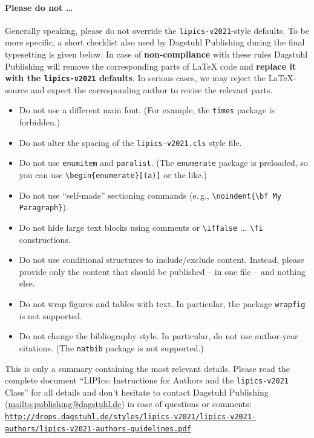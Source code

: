 \documentclass[a4paper,UKenglish,cleveref, autoref, thm-restate]{lipics-v2021}
\begin{document}
\paragraph*{Please do not \ldots} %
Generally speaking, please do not override the \texttt{lipics-v2021}-style defaults. To be more specific, a short checklist also used by Dagstuhl Publishing during the final typesetting is given below.
In case of \textbf{non-compliance} with these rules Dagstuhl Publishing will remove the corresponding parts of \LaTeX{} code and \textbf{replace it with the \texttt{lipics-v2021} defaults}. In serious cases, we may reject the LaTeX-source and expect the corresponding author to revise the relevant parts.
\begin{itemize}
\item Do not use a different main font. (For example, the \texttt{times} package is forbidden.)
\item Do not alter the spacing of the \texttt{lipics-v2021.cls} style file.
\item Do not use \verb+enumitem+ and \verb+paralist+. (The \texttt{enumerate} package is preloaded, so you can use
 \verb+\begin{enumerate}[(a)]+ or the like.)
\item Do not use ``self-made'' sectioning commands (e.\,g., \verb+\noindent{\bf My+ \verb+Paragraph}+).
\item Do not hide large text blocks using comments or \verb+\iffalse+ $\ldots$ \verb+\fi+ constructions.
\item Do not use conditional structures to include/exclude content. Instead, please provide only the content that should be published -- in one file -- and nothing else.
\item Do not wrap figures and tables with text. In particular, the package \texttt{wrapfig} is not supported.
\item Do not change the bibliography style. In particular, do not use author-year citations. (The
\texttt{natbib} package is not supported.)
\end{itemize}

\enlargethispage{\baselineskip}

This is only a summary containing the most relevant details. Please read the complete document ``LIPIcs: Instructions for Authors and the \texttt{lipics-v2021} Class'' for all details and don't hesitate to contact Dagstuhl Publishing (\url{mailto:publishing@dagstuhl.de}) in case of questions or comments:
\href{http://drops.dagstuhl.de/styles/lipics-v2021/lipics-v2021-authors/lipics-v2021-authors-guidelines.pdf}{\texttt{http://drops.dagstuhl.de/styles/lipics-v2021/\newline lipics-v2021-authors/lipics-v2021-authors-guidelines.pdf}}
\end{document}
